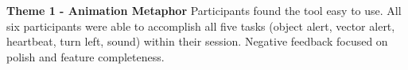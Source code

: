 %

%
%
%




\textbf{Theme 1 - Animation Metaphor}
Participants found the tool easy to use.
All six participants were able to accomplish all five tasks (object alert, vector alert, heartbeat, turn left, sound) within their session.
Negative feedback focused on polish and feature completeness.

